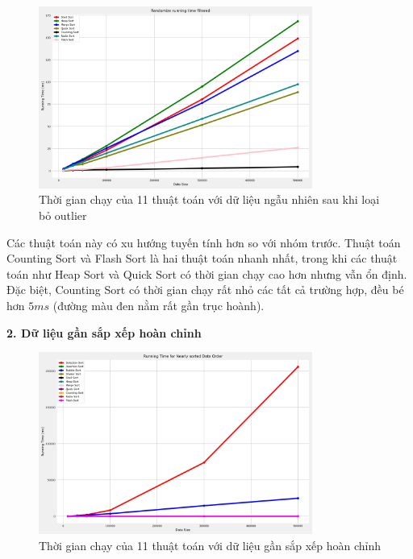 \begin{figure}[H]
    \centering
    \includegraphics[width=0.8\textwidth]{experimental_result/images/randomize_running_time_filtered.png}
    \caption{Thời gian chạy của 11 thuật toán với dữ liệu ngẫu nhiên sau khi loại bỏ outlier}
    \label{fig:randomize_running_time_filtered}
\end{figure}

Các thuật toán này có xu hướng tuyến tính hơn so với nhóm trước. Thuật toán Counting Sort và Flash Sort là hai thuật toán nhanh nhất, trong khi các thuật toán như Heap Sort và Quick Sort có thời gian chạy cao hơn nhưng vẫn ổn định. Đặc biệt, Counting Sort có thời gian chạy rất nhỏ các tất cả trường hợp, đều bé hơn $5 ms$ (đường màu đen nằm rất gần trục hoành).


\textbf{2. Dữ liệu gần sắp xếp hoàn chỉnh}

\begin{figure}[H]
    \centering
    \includegraphics[width=0.8\textwidth]{experimental_result/images/nearly_sorted_running_time.png}
    \caption{Thời gian chạy của 11 thuật toán với dữ liệu gần sắp xếp hoàn chỉnh}
    \label{fig:nearly_sorted_running_time}
\end{figure}


